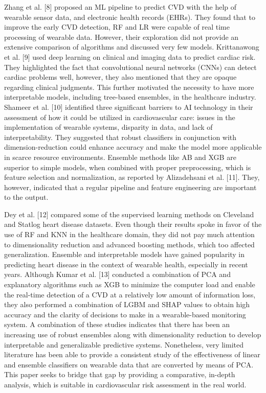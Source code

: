 \documentclass[conference]{IEEEtran}
\begin{document}
Zhang et al. [8] proposed an ML pipeline to predict CVD with the help of wearable sensor data, and electronic health records (EHRs). They found that to improve the early CVD detection, RF and LR were capable of real time processing of wearable data. However, their exploration did not provide an extensive comparison of algorithms and discussed very few models. Krittanawong et al. [9] used deep learning on clinical and imaging data to predict cardiac risk. They highlighted the fact that convolutional neural networks (CNNs) can detect cardiac problems well, however, they also mentioned that they are opaque regarding clinical judgments. This further motivated the necessity to have more interpretable models, including tree-based ensembles, in the healthcare industry. Shameer et al. [10] identified three significant barriers to AI technology in their assessment of how it could be utilized in cardiovascular care: issues in the implementation of wearable systems, disparity in data, and lack of interpretability. They suggested that robust classifiers in conjunction with dimension-reduction could enhance accuracy and make the model more applicable in scarce resource environments. Ensemble methods like AB and XGB are superior to simple models, when combined with proper preprocessing, which is feature selection and normalization, as reported by Alizadehsani et al. [11]. They, however, indicated that a regular pipeline and feature engineering are important to the output.

\vspace{1em}

Dey et al. [12] compared some of the supervised learning methods on Cleveland and Statlog heart disease datasets. Even though their results spoke in favor of the use of RF and KNN in the healthcare domain, they did not pay much attention to dimensionality reduction and advanced boosting methods, which too affected generalization. Ensemble and interpretable models have gained popularity in predicting heart disease in the context of wearable health, especially in recent years. Although Kumar et al. [13] conducted a combination of PCA and explanatory algorithms such as XGB to minimize the computer load and enable the real-time detection of a CVD at a relatively low amount of information loss, they also performed a combination of LGBM and SHAP values to obtain high accuracy and the clarity of decisions to make in a wearable-based monitoring system. A combination of these studies indicates that there has been an increasing use of robust ensembles along with dimensionality reduction to develop interpretable and generalizable predictive systems. Nonetheless, very limited literature has been able to provide a consistent study of the effectiveness of linear and ensemble classifiers on wearable data that are converted by means of PCA. This paper seeks to bridge that gap by providing a comparative, in-depth analysis, which is suitable in cardiovascular risk assessment in the real world.
\end{document}
